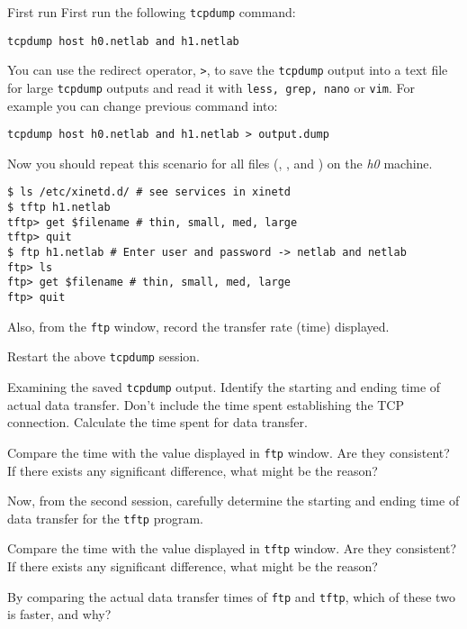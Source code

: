 \documentclass{../UTNetLab}
\begin{document}
    First run First run the following \lstinline{tcpdump} command:
    \begin{lstlisting}[emph={h0,h1,netlab},morekeywords={[3]host,and}]
tcpdump host h0.netlab and h1.netlab
    \end{lstlisting}

    You can use the redirect operator, \lstinline{>}, to save the \lstinline{tcpdump} output into a text file for large \lstinline{tcpdump} outputs and read it with \lstinline{less, grep, nano} or \lstinline{vim}.
    For example you can change previous command into:
    \begin{lstlisting}[emph={h0,h1,netlab,output,dump},morekeywords={[3]host,and}]
tcpdump host h0.netlab and h1.netlab > output.dump
    \end{lstlisting}
    
    Now you should repeat this scenario for all files (, ,  and ) on the \textit{h0} machine.
    \begin{lstlisting}[emph={h1,netlab},morekeywords={[2]get,quit}]
$ ls /etc/xinetd.d/ # see services in xinetd
$ tftp h1.netlab
tftp> get $filename # thin, small, med, large
tftp> quit
$ ftp h1.netlab # Enter user and password -> netlab and netlab
ftp> ls
ftp> get $filename # thin, small, med, large
ftp> quit
    \end{lstlisting}

    Also, from the \lstinline{ftp} window, record the transfer rate (time) displayed.

    Restart the above \lstinline{tcpdump} session.

    \begin{report}
        \item Examining the saved \lstinline{tcpdump} output.
            Identify the starting and ending time of actual data transfer.
            Don’t include the time spent establishing the TCP connection.
            Calculate the time spent for data transfer.

        \item Compare the time with the value displayed in \lstinline{ftp} window.
            Are they consistent?
            If there exists any significant difference, what might be the reason? 

        \item Now, from the second session, carefully determine the starting and ending time of data transfer for the \lstinline{tftp} program.

        \item Compare the time with the value displayed in \lstinline{tftp} window.
            Are they consistent?
            If there exists any significant difference, what might be the reason? 

        \item By comparing the actual data transfer times of \lstinline{ftp} and \lstinline{tftp}, which of these two is faster, and why?
    \end{report}
\end{document}
